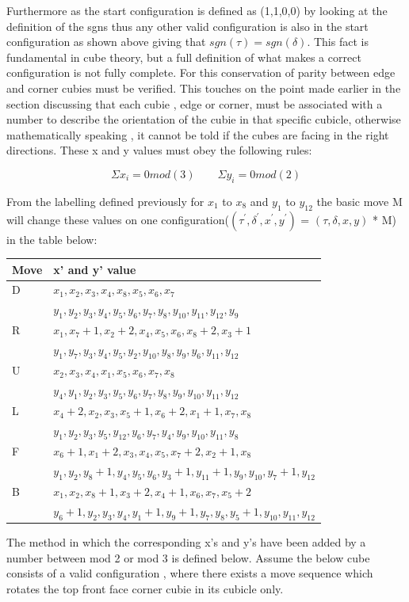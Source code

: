 \documentclass{article}
\begin{document}
Furthermore as the start configuration is defined as (1,1,0,0) by looking at the definition of the sgns thus any other valid configuration is also in the start configuration as shown above giving that $sgn(\tau) = sgn(\delta)$. 
This fact is fundamental in cube theory, but a full definition of what makes a correct configuration is not fully complete. For this conservation of parity between edge and corner cubies must be verified. This touches on the point made earlier in the section discussing that each cubie , edge or corner, must be associated with a number to describe the orientation of the cubie in that specific cubicle, otherwise mathematically speaking , it cannot be told if the cubes are facing in the right directions. These x and y values must obey the following rules: 

\begin{equation}
\Sigma x_{i} =0mod(3) \qquad \Sigma y_{i} =0mod(2) 
\end{equation}

From the labelling defined previously for $x_{1}$ to $x_{8}$ and $y_{1}$ to $y_{12}$ the basic move M will change these values on one configuration($(\tau^{'} ,\delta^{'} , x^{'} , y^{'} )$ = $(\tau,\delta, x, y)$ * M) in the table below\cite{chengroup}:

\begin{center}
    \begin{tabular}{ | l | p{12cm} |}
    \hline
    Move & x' and y' value \\ \hline
    D &  $x_1,x_2,x_3,x_4,x_8,x_5,x_6,x_7$ \\
& $y_1,y_2,y_3,y_4,y_5,y_6,y_7,y_8,y_{10},y_{11},y_{12},y_9$\\ \hline
    R &  $x_1,x_7 +1,x_2 +2,x_4,x_5,x_6,x_8 +2,x_3 +1$\\ & $y_1,y_7,y_3,y_4,y_5,y_2,y_{10},y_{8},y_{9},y_{6},y_{11},y_{12}$\\ \hline
    U &  $x_2,x_3,x_4,x_1,x_5,x_6,x_7,x_8$ \\ & $y_4,y_1,y_2,y_3,y_5,y_6,y_{7},y_{8},y_{9},y_{10},y_{11},y_{12}$\\ \hline
    L & $x_4 +2,x_2,x_3,x_5 + 1,x_6 +2,x_1 + 1,x_7,x_8$ \\
& $y_1,y_2,y_3,y_5,y_12,y_6,y_{7},y_{4},y_{9},y_{10},y_{11},y_{8}$\\ \hline
    F &  $x_6 +1,x_1 +2,x_3,x_4,x_5,x_7 +2,x_2 +1,x_8$\\
& $y_1,y_2,y_8 +1,y_4,y_5,y_6,y_{3}+1,y_{11}+1,y_{9},y_{10},y_{7}+1,y_{12}$\\ \hline
    B &  $x_1,x_2,x_8 +1,x_3 + 2,x_4 + 1,x_6,x_7,x_5 +2$ \\
&$y_6 +1,y_2,y_3,y_4,y_1 +1,y_9 +1,y_{7},y_{8},y_{5}+1,y_{10},y_{11},y_{12}$\\ \hline
    \end{tabular}
\end{center}
The method in which the corresponding x's and y's have been added by a number between mod 2 or mod 3 is defined below. Assume the below cube consists of a valid configuration , where there exists a move sequence which rotates the top front face corner cubie in its cubicle only. 
\end{document}
